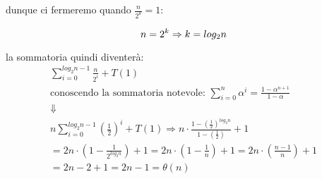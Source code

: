 \documentclass[a4paper, 12pt]{article} %
\begin{document}
dunque ci fermeremo quando $\frac{n}{2^k} = 1$:

$$
n = 2^{k} \Rightarrow k = log_{2} n  \\
$$

la sommatoria quindi diventerà:
\begin{gather*}
  \sum_{i = 0}^{log_{2}n - 1} \frac{n}{2^i} + T(1) \\
  \text{conoscendo la sommatoria notevole: $\sum_{i = 0}^{n} \alpha^{i} = \frac{1-\alpha^{n+1}}{1 - \alpha}$} \\
  \Downarrow \\
  n \sum_{i = 0}^{log_{2}n-1} (\frac{1}{2})^{i} + T(1) \Rightarrow n \cdot \frac{1 - (\frac{1}{2})^{log_{2}n}}{1 - (\frac{1}{2})} + 1 \\
  = 2n \cdot (1 - \frac{1}{2^{log_{2}n}}) + 1 = 2n \cdot (1 - \frac{1}{n}) + 1 = 2n \cdot (\frac{n - 1}{n}) + 1 \\
  = 2n - 2 + 1 = 2n - 1 = \theta(n)
\end{gather*} 

\vfill

\end{document}
